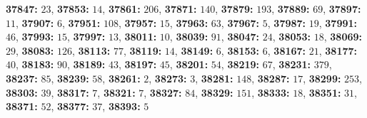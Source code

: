 \textsf{\bfseries 37847:} $23$, \textsf{\bfseries 37853:} $14$, \textsf{\bfseries 37861:} $206$, \textsf{\bfseries 37871:} $140$, \textsf{\bfseries 37879:} $193$, \textsf{\bfseries 37889:} $69$, \textsf{\bfseries 37897:} $11$, \textsf{\bfseries 37907:} $6$, \textsf{\bfseries 37951:} $108$, \textsf{\bfseries 37957:} $15$, \textsf{\bfseries 37963:} $63$, \textsf{\bfseries 37967:} $5$, \textsf{\bfseries 37987:} $19$, \textsf{\bfseries 37991:} $46$, \textsf{\bfseries 37993:} $15$, \textsf{\bfseries 37997:} $13$, \textsf{\bfseries 38011:} $10$, \textsf{\bfseries 38039:} $91$, \textsf{\bfseries 38047:} $24$, \textsf{\bfseries 38053:} $18$, \textsf{\bfseries 38069:} $29$, \textsf{\bfseries 38083:} $126$, \textsf{\bfseries 38113:} $77$, \textsf{\bfseries 38119:} $14$, \textsf{\bfseries 38149:} $6$, \textsf{\bfseries 38153:} $6$, \textsf{\bfseries 38167:} $21$, \textsf{\bfseries 38177:} $40$, \textsf{\bfseries 38183:} $90$, \textsf{\bfseries 38189:} $43$, \textsf{\bfseries 38197:} $45$, \textsf{\bfseries 38201:} $54$, \textsf{\bfseries 38219:} $67$, \textsf{\bfseries 38231:} $379$, \textsf{\bfseries 38237:} $85$, \textsf{\bfseries 38239:} $58$, \textsf{\bfseries 38261:} $2$, \textsf{\bfseries 38273:} $3$, \textsf{\bfseries 38281:} $148$, \textsf{\bfseries 38287:} $17$, \textsf{\bfseries 38299:} $253$, \textsf{\bfseries 38303:} $39$, \textsf{\bfseries 38317:} $7$, \textsf{\bfseries 38321:} $7$, \textsf{\bfseries 38327:} $84$, \textsf{\bfseries 38329:} $151$, \textsf{\bfseries 38333:} $18$, \textsf{\bfseries 38351:} $31$, \textsf{\bfseries 38371:} $52$, \textsf{\bfseries 38377:} $37$, \textsf{\bfseries 38393:} $5$